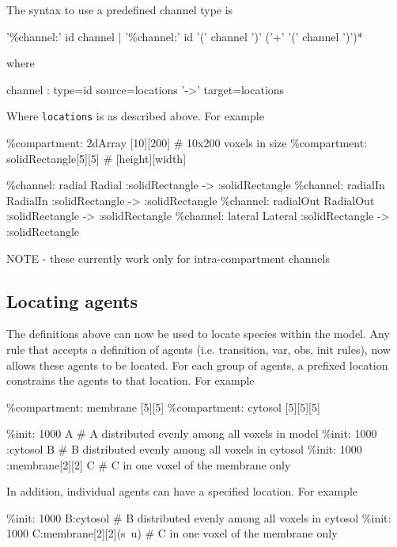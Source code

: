 The syntax to use a predefined channel type is

\begin{bnfsource}
'\%channel:' id channel
| '\%channel:' id '(' channel ')' ('+' '(' channel ')')*
\end{bnfsource}
where
\begin{bnfsource}
channel :
  type=id source=locations '->' target=locations
\end{bnfsource}
Where \verb|locations| is as described above. For example
\begin{kappasource}
\%compartment: 2dArray [10][200]    # 10x200 voxels in size 
\%compartment: solidRectangle[5][5] # [height][width]

\%channel: radial Radial :solidRectangle -> :solidRectangle
\%channel: radialIn RadialIn :solidRectangle -> :solidRectangle
\%channel: radialOut RadialOut :solidRectangle -> :solidRectangle
\%channel: lateral Lateral :solidRectangle -> :solidRectangle
\end{kappasource}

NOTE - these currently work only for intra-compartment channels

\subsection{Locating agents}

The definitions above can now be used to locate species within the model. Any rule that accepts a definition of agents (i.e. transition, var, obs, init rules), now allows these agents to be located. For each group of agents, a prefixed location constrains the agents to that location. For example

\begin{kappasource}
\%compartment: membrane [5][5]
\%compartment: cytosol [5][5][5]

\%init: 1000 A                   # A distributed evenly among all voxels in model 
\%init: 1000 :cytosol B          # B distributed evenly among all voxels in cytosol
\%init: 1000 :membrane[2][2] C   # C in one voxel of the membrane only 
\end{kappasource}

In addition, individual agents can have a specified location. For example
\begin{kappasource}
\%init: 1000 B:cytosol             # B distributed evenly among all voxels in cytosol
\%init: 1000 C:membrane[2][2](s~u) # C in one voxel of the membrane only 
\end{kappasource}

